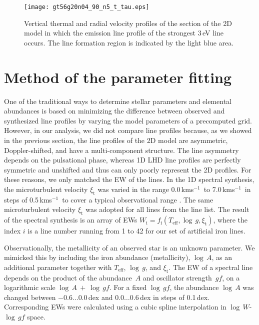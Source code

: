 \documentclass{aa}
\newcommand{\kmos}{kms$^{-1}$}
\begin{document}
\begin{figure}
\texttt{[image: gt56g20n04\_90\_n5\_t\_tau.eps]}
\caption{Vertical thermal and radial velocity profiles of the section of the
  2D model in which the emission line profile of the strongest
   3\,eV line occurs.  The line formation region is indicated by the
  light blue area.}
\label{emission}
\end{figure} 
   

\section{Method of the parameter fitting}

One of the traditional ways to determine stellar parameters and elemental
abundances is based on minimizing the difference between observed and
synthesized line profiles by varying the model parameters of a precomputed
grid. However, in our analysis, we did not compare line profiles because, as
we showed in the previous section, the line profiles of the 2D
model are asymmetric, Doppler-shifted, and have a multi-component structure.
The line asymmetry depends on the pulsational phase, whereas 1D LHD line
profiles are perfectly symmetric and unshifted and thus can only poorly
represent the 2D profiles. For these reasons, we only matched the EW of the lines. In the 1D spectral synthesis, the microturbulent velocity
$\xi_\mathrm{t}$ was varied in the range 0.0\,\kmos\ to 7.0\,\kmos\ in steps of
0.5\,\kmos\ to cover a typical observational range \citep{2002A&A...384..140A}.
The same microturbulent velocity $\xi_\mathrm{t}$ was adopted for all lines
from the line list.  The result of the spectral synthesis is an array of EWs
$W_\mathrm{i}=f_\mathrm{i}(T_\mathrm{eff}, \log\,g, \xi_\mathrm{t})$, where
the index $i$ is a line number running from 1 to 42 for our set of artificial
iron lines.

Observationally, the metallicity of an observed star is an unknown parameter.
We mimicked this by including the iron abundance (metallicity), $\log\,A$, as
an additional parameter together with $T_\mathrm{eff}$, $\log\,g$, and
$\xi_\mathrm{t}$.  The EW of a spectral line depends on the product of the
abundance~$A$ and oscillator strength~$gf$, on a logarithmic scale $\log\,A
\ + \ \log\,gf$.  For a fixed $\log\,gf$, the abundance $\log\,A$ was changed
between $-0.6 \ldots 0.0$\,dex and $0.0 \ldots 0.6$\,dex in steps of
0.1\,dex.  Corresponding EWs were calculated using a cubic spline
interpolation in $\log\,W$-$\log\,gf$ space.
\end{document}
